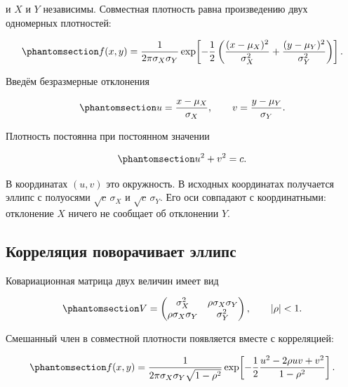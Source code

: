 \documentclass[
  russian,
  11pt,
  a4paper,
  open=any]{scrbook}
\begin{document}
и \(X\) и \(Y\) независимы. Совместная плотность равна произведению двух
одномерных плотностей:

\begin{equation}\protect\phantomsection\label{eq-ch7-independent-density}{
f(x,y)=
\frac{1}{2\pi\sigma_X\sigma_Y}
\exp\!\left[-\frac12\left(
\frac{(x-\mu_X)^2}{\sigma_X^2}
+\frac{(y-\mu_Y)^2}{\sigma_Y^2}
\right)\right].
}\end{equation}

Введём безразмерные отклонения

\begin{equation}\protect\phantomsection\label{eq-ch7-standardized-coordinates}{
u=\frac{x-\mu_X}{\sigma_X},
\qquad
v=\frac{y-\mu_Y}{\sigma_Y}.
}\end{equation}

Плотность постоянна при постоянном значении

\begin{equation}\protect\phantomsection\label{eq-ch7-independent-contour}{
u^2+v^2=c.
}\end{equation}

В координатах \((u,v)\) это окружность. В исходных координатах
получается эллипс с полуосями \(\sqrt c\,\sigma_X\) и
\(\sqrt c\,\sigma_Y\). Его оси совпадают с координатными: отклонение
\(X\) ничего не сообщает об отклонении \(Y\).

\subsection{Корреляция поворачивает
эллипс}\label{ux43aux43eux440ux440ux435ux43bux44fux446ux438ux44f-ux43fux43eux432ux43eux440ux430ux447ux438ux432ux430ux435ux442-ux44dux43bux43bux438ux43fux441}

Ковариационная матрица двух величин имеет вид

\begin{equation}\protect\phantomsection\label{eq-ch7-two-dimensional-covariance}{
V=
\begin{pmatrix}
\sigma_X^2 & \rho\sigma_X\sigma_Y\\
\rho\sigma_X\sigma_Y & \sigma_Y^2
\end{pmatrix},
\qquad |\rho|<1.
}\end{equation}

Смешанный член в совместной плотности появляется вместе с корреляцией:

\begin{equation}\protect\phantomsection\label{eq-ch7-correlated-density}{
f(x,y)=
\frac{1}{2\pi\sigma_X\sigma_Y\sqrt{1-\rho^2}}
\exp\!\left[-\frac12
\frac{u^2-2\rho uv+v^2}{1-\rho^2}
\right].
}\end{equation}
\end{document}
